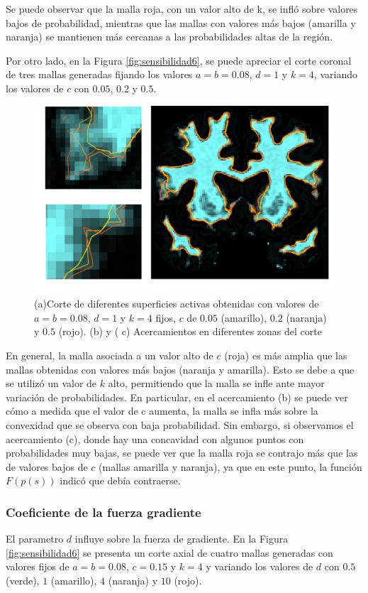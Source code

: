 Se puede observar que la malla roja, con un valor alto de k, se infló sobre valores bajos de probabilidad, mientras que las mallas con valores más bajos (amarilla y naranja) se mantienen más cercanas a las probabilidades altas de la región.

Por otro lado, en la Figura \ref{fig:sensibilidad6}, se puede apreciar el corte coronal de tres mallas generadas fijando los valores $a=b=0.08$, $d=1$ y $k=4$,  variando los valores de $c$ con $0.05$, $0.2$ y $0.5$.

\begin{figure}[H]
	\centering
	\includegraphics[scale=0.05]{images/sensibilidad9.jpg}
	\caption{(a)Corte de diferentes superficies activas obtenidas con valores de $a=b=0.08$, $d=1$ y $k=4$ fijos, $c$ de $0.05$ (amarillo), $0.2$ (naranja) y $0.5$ (rojo). (b) y ( c) Acercamientos en diferentes zonas del corte}
	\label{fig:sensibilidad9}
\end{figure}

En general, la malla asociada a un valor alto de  $c$ (roja) es más amplia que las mallas obtenidas con valores más bajos (naranja y amarilla). Esto se debe a que se utilizó un valor de $k$ alto, permitiendo que la malla se infle ante mayor variación de probabilidades. En particular, en el acercamiento (b) se puede ver cómo a medida que el valor de c aumenta, la malla se infla más sobre la convexidad que se observa con baja probabilidad. Sin embargo, si observamos el acercamiento (c), donde hay una concavidad con algunos puntos con probabilidades muy bajas, se puede ver que la malla roja se contrajo más que las de valores bajos de $c$ (mallas amarilla y naranja), ya que en este punto, la función $F(p(s))$ indicó que debía contraerse.

\subsubsection{Coeficiente de la fuerza gradiente}
El parametro $d$ influye sobre la fuerza de gradiente. En la Figura \ref{fig:sensibilidad6} se presenta un corte axial de cuatro mallas generadas con valores fijos de $a=b=0.08$, $c=0.15$ y $k=4$ y variando los valores de $d$ con $0.5$ (verde), $1$ (amarillo), $4$ (naranja) y $10$ (rojo).

